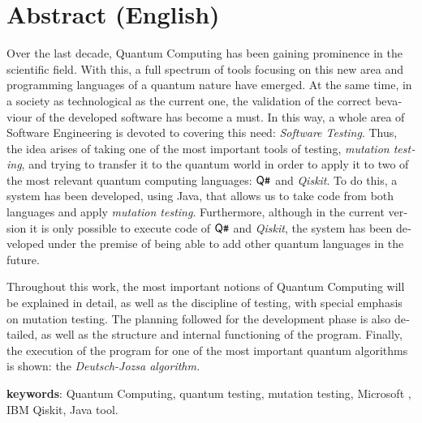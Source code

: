 \section*{Abstract (English)}
\begin{otherlanguage}{british}
Over the last decade, Quantum Computing has been gaining prominence in the scientific field. With this, a full spectrum of tools focusing on this new area and programming languages of a quantum nature have emerged.
%
At the same time, in a society as technological as the current one, the validation of  the correct bevaviour of the developed software has become a must. In this way, a whole area of Software Engineering is devoted to covering this need: \emph{Software Testing}.
%
Thus, the idea arises of taking one of the most important tools of testing, \textit{mutation testing}, and trying to transfer it to the quantum world in order to apply it to two of the most relevant quantum computing languages: $\textsf{Q}\texttt{\#}$ and \textit{Qiskit}. To do this, a system has been developed, using Java, that allows us to take code from both languages  and apply \textit{mutation testing}. Furthermore, although in the current version it is only possible to execute code of $\textsf{Q}\texttt{\#}$ and \textit{Qiskit}, the system has been developed under the premise of being able to add other quantum languages in the future.

Throughout this work, the most important notions of Quantum Computing will be explained in detail, as well as the discipline of testing, with special emphasis on mutation testing. The planning followed for the development phase is also detailed, as well as the structure and internal functioning of the program. Finally, the execution of the program for one of the most important quantum algorithms is shown: the \textit{Deutsch-Jozsa algorithm.}
\end{otherlanguage}

\textbf{keywords}: Quantum Computing, quantum testing, mutation testing, Microsoft \qsh, IBM Qiskit, Java tool.
